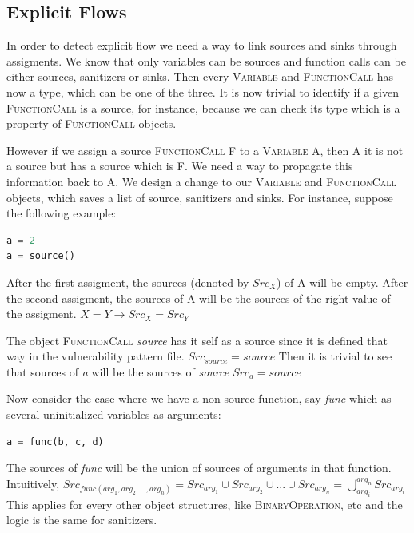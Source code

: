 \subsection*{Explicit Flows}
In order to detect explicit flow we need a way to link sources and sinks through assigments.
We know that only variables can be sources and function calls can be either sources, sanitizers or sinks.
Then every \textsc{Variable} and \textsc{FunctionCall} has now a type, which can be one of the three. It is now trivial
to identify if a given \textsc{FunctionCall} is a source, for instance, because we can check its type which is a
property of \textsc{FunctionCall} objects.

However if we assign a source \textsc{FunctionCall} F to a \textsc{Variable} A, then A it is not a source
but has a source which is F. We need a way to propagate this information back to A.
We design a change to our \textsc{Variable} and \textsc{FunctionCall} objects, which saves a list of source,
sanitizers and sinks. For instance, suppose the following example:

\begin{lstlisting}[language=Python]
a = 2
a = source()
\end{lstlisting}

After the first assigment, the sources (denoted by $Src_X$) of A will be empty.
After the second assigment, the sources of A will be the sources of the right value of the assigment.
$X = Y \rightarrow Src_X = Src_Y$

The object \textsc{FunctionCall} \textit{source} has it self as a source since it is defined that
way in the vulnerability pattern file. $Src_{source} = source$
Then it is trivial to see that sources of \textit{a} will be the sources of \textit{source} $Src_a = source$

Now consider the case where we have a non source function, say \textit{func} which as several uninitialized
variables as arguments:

\begin{lstlisting}[language=Python]
a = func(b, c, d)
\end{lstlisting}

The sources of \textit{func} will be the union of sources of arguments in that function.
Intuitively, $Src_{func(arg_1, arg_2, ..., arg_n)} = Src_{arg_1} \cup Src_{arg_2} \cup ... \cup Src_{arg_n} = \bigcup_{arg_i}^{arg_n} Src_{arg_i} $
This applies for every other object structures, like \textsc{BinaryOperation}, etc and the logic is the
same for sanitizers.


